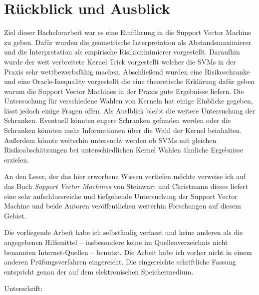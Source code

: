 \documentclass{article}
\theoremstyle{plain}
\theoremstyle{definition}
\begin{document}
    \section{Rückblick und Ausblick}
        Ziel dieser Bachelorarbeit war es eine Einführung in die Support Vector Machine zu geben. Dafür wurden die geometrische Interpretation als Abstandsmaximierer und die Interpretation als empirische Risikominimierer vorgestellt.
        Daraufhin wurde der weit verbreitete Kernel Trick vorgestellt welcher die SVMs in der Praxis sehr wettbewerbsfähig machen. Abschließend wurden eine Risikoschranke und eine Oracle-Inequality vorgestellt die eine theoretische Erklärung dafür geben warum die Support Vector Machines in der Praxis gute Ergebnisse liefern. Die Untersuchung für verschiedene Wahlen von Kerneln hat einige Einblicke gegeben, lässt jedoch einige Fragen offen. Als Auslblick bleibt die weitere Untersuchung der Schranken. Eventuell könnten engere Schranken gefunden werden oder die Schranken könnten mehr Informationen über die Wahl der Kernel beinhalten. Außerdem könnte weiterhin untersucht werden ob SVMs mit gleichen Risikoabschätzungen bei unterschiedlichen Kernel Wahlen ähnliche Ergebnisse erzielen.
        
        An den Leser, der das hier erworbene Wissen vertiefen möchte verweise ich auf das Buch \textit{Support Vector Machines}\cite{svm} von Steinwart und Christmann dieses liefert eine sehr aufschlussreiche und tiefgehende Untersuchung der Support Vector Machine und beide Autoren veröffentlichen weiterhin Forschungen auf diesem Gebiet.
        
        
\newpage

        \printbibliography
        
        
        \newpage
            Die vorliegende Arbeit habe ich selbständig verfasst und keine anderen als die
        angegebenen Hilfsmittel – insbesondere keine im Quellenverzeichnis nicht benannten
        Internet-Quellen – benutzt. Die Arbeit habe ich vorher nicht in einem anderen
        Prüfungsverfahren eingereicht. Die eingereichte schriftliche Fassung entspricht genau
        der auf dem elektronischen Speichermedium.
        
        \vspace*{2cm}
        
        Unterschrift:
 
\end{document}
